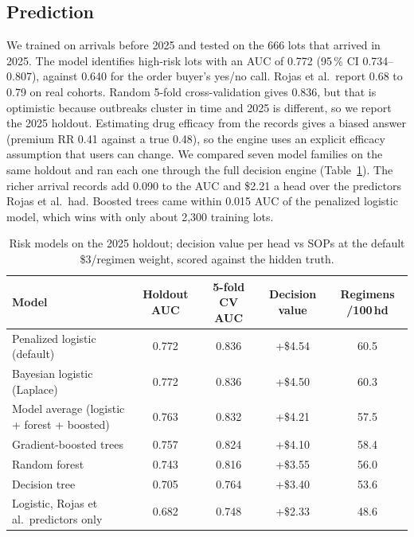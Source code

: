 \documentclass[10pt,letterpaper]{article}
\newcommand{\pct}{\,\%}
\newcommand{\usd}[1]{\$#1}
\begin{document}
\subsection{Prediction}
We trained on arrivals before 2025 and tested on the 666 lots that arrived in 2025. The model identifies high-risk lots with an AUC of 0.772 (95\pct{} CI 0.734--0.807), against 0.640 for the order buyer's yes/no call. Rojas et al.\ report 0.68 to 0.79 on real cohorts. Random 5-fold cross-validation gives 0.836, but that is optimistic because outbreaks cluster in time and 2025 is different, so we report the 2025 holdout. Estimating drug efficacy from the records gives a biased answer (premium RR 0.41 against a true 0.48), so the engine uses an explicit efficacy assumption that users can change. We compared seven model families on the same holdout and ran each one through the full decision engine (Table~\ref{tab:models}). The richer arrival records add 0.090 to the AUC and \usd{2.21} a head over the predictors Rojas et al.\ had. Boosted trees came within 0.015 AUC of the penalized logistic model, which wins with only about 2,300 training lots.

\begin{table}[h]
\centering\small
\caption{Risk models on the 2025 holdout; decision value per head vs SOPs at the default \usd{3}/regimen weight, scored against the hidden truth.}\label{tab:models}
\begin{tabular}{@{}lcccc@{}}
\toprule
\textbf{Model} & \textbf{Holdout AUC} & \textbf{5-fold CV AUC} & \textbf{Decision value} & \textbf{Regimens /100\,hd} \\
\midrule
Penalized logistic (default) & 0.772 & 0.836 & +\usd{4.54} & 60.5 \\
Bayesian logistic (Laplace) & 0.772 & 0.836 & +\usd{4.50} & 60.3 \\
Model average (logistic + forest + boosted) & 0.763 & 0.832 & +\usd{4.21} & 57.5 \\
Gradient-boosted trees & 0.757 & 0.824 & +\usd{4.10} & 58.4 \\
Random forest & 0.743 & 0.816 & +\usd{3.55} & 56.0 \\
Decision tree & 0.705 & 0.764 & +\usd{3.40} & 53.6 \\
Logistic, Rojas et al.\ predictors only & 0.682 & 0.748 & +\usd{2.33} & 48.6 \\
\bottomrule
\end{tabular}
\end{table}
\end{document}

